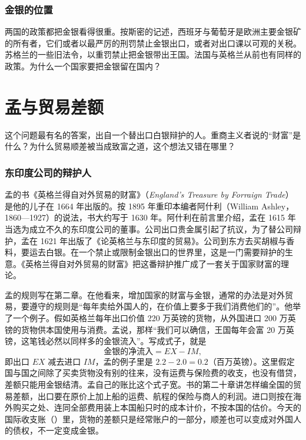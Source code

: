 \subsubsection{金银的位置}
两国的政策都把金银看得很重。按斯密的记述，西班牙与葡萄牙是欧洲主要金银矿的所有者，它们或者以最严厉的刑罚禁止金银出口，或者对出口课以可观的关税。苏格兰的一些旧法令，以重罚禁止把金银带出王国。法国与英格兰从前也有同样的政策\cite{smith1776}。为什么一个国家要把金银留在国内？

\section{孟与贸易差额}\label{sec:merc-mun}

这个问题最有名的答案，出自一个替出口白银辩护的人。重商主义者说的“财富”是什么？为什么贸易顺差被当成致富之道，这个想法又错在哪里？

\subsubsection{东印度公司的辩护人}
孟的书《英格兰得自对外贸易的财富》（\emph{England's Treasure by Forraign Trade}）是他的儿子在 1664 年出版的。按 1895 年重印本编者阿什利（William Ashley，1860—1927）的说法，书大约写于 1630 年\cite{mun1664}。阿什利在前言里介绍，孟在 1615 年当选为成立不久的东印度公司的董事。公司出口贵金属引起了抗议，为了替公司辩护，孟在 1621 年出版了《论英格兰与东印度的贸易》\cite{mun1664}。公司到东方去买胡椒与香料，要运去白银。在一个禁止或限制金银出口的世界里，这是一门需要辩护的生意。《英格兰得自对外贸易的财富》把这番辩护推广成了一套关于国家财富的理论。

孟的规则写在第二章。在他看来，增加国家的财富与金银，通常的办法是对外贸易，要遵守的规则是“每年卖给外国人的，在价值上要多于我们消费他们的”。他举了一个例子。假如英格兰每年出口价值 220 万英镑的货物，从外国进口 200 万英镑的货物供本国使用与消费。孟说，那样“我们可以确信，王国每年会富 20 万英镑，这笔钱必然以同样多的金银流入”\cite{mun1664}。写成式子，就是
\begin{equation*}
\text{金银的净流入}=\mathit{EX}-\mathit{IM},
\end{equation*}
即出口 $\mathit{EX}$ 减去进口 $\mathit{IM}$，孟的例子里是 $2.2-2.0=0.2$（百万英镑）。这里假定国与国之间除了买卖货物没有别的往来，没有运费与保险费的收支，也没有借贷，差额只能用金银结清。孟自己的账比这个式子宽。书的第二十章讲怎样编全国的贸易差额，出口要在原价上加上船的运费、航程的保险与商人的利润。进口则按在海外购买之处、连同全部费用装上本国船只时的成本计价，不按本国的估价\cite{mun1664}。今天的国际收支账（）里，货物的差额只是经常账户的一部分，顺差也可以变成对外国人的债权，不一定变成金银。

